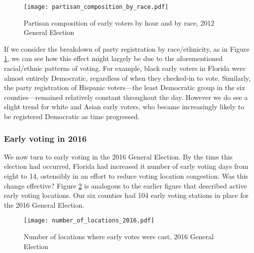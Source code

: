 \documentclass[12pt,titlepage]{article}
\begin{document}
\begin{figure}[!ht]
\caption{Partisan composition of early voters by hour and by race, 2012
  General Election}
  \label{fig:party2012}
  \centering
    \centering\texttt{[image: partisan\_composition\_by\_race.pdf]}
\end{figure}

%

If we consider the breakdown of party registration by race/ethnicity,
as in Figure \ref{fig:party2012}, we can see how this effect might
largely be due to the aforementioned racial/ethnic patterns of voting.
For example, black early voters in Florida were almost entirely
Democratic, regardless of when they checked-in to vote.  Similarly,
the party registration of Hispanic voters---the least Democratic group
in the six counties---remained relatively constant throughout the day.
However we do see a slight trend for white and Asian early voters, who
became increasingly likely to be registered Democratic as time
progressed.


\subsubsection*{Early voting in 2016}

We now turn to early voting in the 2016 General Election.  By the time
this election had occurred, Florida had increased it number of early
voting days from eight to 14, ostensibly in an effort to reduce voting
location congestion. Was this change effective?  Figure
\ref{fig:nrlocs2016} is analogous to the earlier figure that described
active early voting locations. Our six counties had 104 early voting
stations in place for the 2016 General Election.


\begin{figure}[!ht]
  \caption{Number of locations where early votes were cast, 2016 General
    Election}
  \label{fig:nrlocs2016}
  \centering
    \centering\texttt{[image: number\_of\_locations\_2016.pdf]}
\end{figure}
\end{document}
